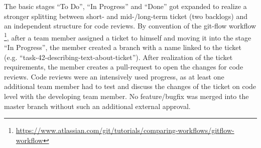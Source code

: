 The basic stages “To Do”, “In Progress” and “Done” got expanded to realize a stronger splitting between short- and mid-/long-term ticket (two backlogs) and an independent structure for code reviews.
By convention of the git-flow workflow \footnote{\url{https://www.atlassian.com/git/tutorials/comparing-workflows/gitflow-workflow}}, after a team member assigned a ticket to himself and moving it into the stage “In Progress”, the member created a branch with a name linked to the ticket (e.g. “task-42-describing-text-about-ticket”). After realization of the ticket requirements, the member creates a pull-request to open the changes for code reviews.
Code reviews were an intensively used progress, as at least one additional team member had to test and discuss the changes of the ticket on code level with the developing team member. No feature/bugfix was merged into the master branch without such an additional external approval.

